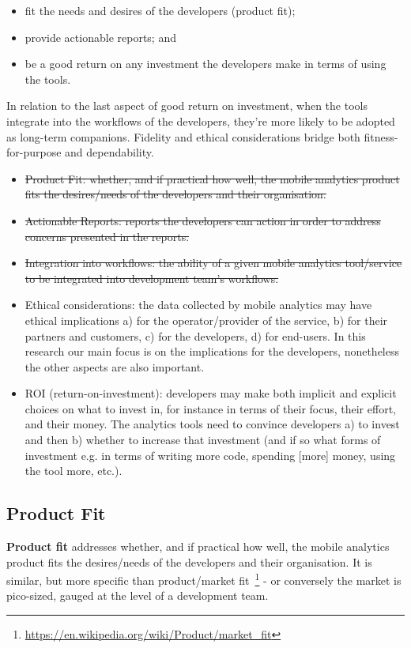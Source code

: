 \begin{itemize}
\item fit the needs and desires of the developers (product fit); 
\item provide actionable reports; and 
\item be a good return on any investment the developers make in terms of using the tools.
\end{itemize}
 
 In relation to the last aspect of good return on investment, when the tools integrate into the workflows of the developers, they're more likely to be adopted as long-term companions. Fidelity and ethical considerations bridge both fitness-for-purpose and dependability.

{\small
\begin{itemize}
    \itemsep0em
    \item \sout{Product Fit: whether, and if practical how well, the mobile analytics product fits the desires/needs of the developers and their organisation.}
    \item \sout{Actionable Reports: reports the developers can action in order to address concerns presented in the reports.}
    \item \sout{Integration into workflows: the ability of a given mobile analytics tool/service to be integrated into development team's workflows.}
    \item Ethical considerations: the data collected by mobile analytics may have ethical implications a) for the operator/provider of the service, b) for their partners and customers, c) for the developers, d) for end-users. In this research our main focus is on the implications for the developers, nonetheless the other aspects are also important.
    \item ROI (return-on-investment): developers may make both implicit and explicit choices on what to invest in, for instance in terms of their focus, their effort, and their money. The analytics tools need to convince developers a) to invest and then b) whether to increase that investment (and if so what forms of investment e.g. in terms of writing more code, spending [more] money, using the tool more, etc.).

\end{itemize}
}

\subsection{Product Fit}
\textbf{Product fit} addresses whether, and if practical how well, the mobile analytics product fits the desires/needs of the developers and their organisation. It is similar, but more specific than product/market fit~\footnote{\url{https://en.wikipedia.org/wiki/Product/market_fit}} - or conversely the market is pico-sized, gauged at the level of a development team. %

